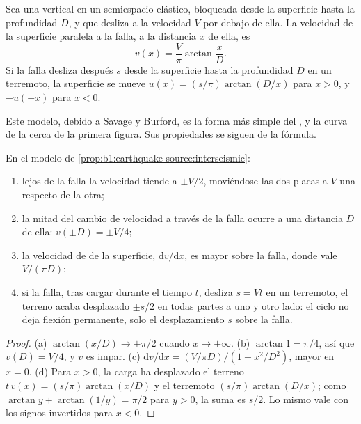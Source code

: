 \begin{proposition}\label{prop:b1:earthquake-source:interseismic}
Sea una  vertical en un semiespacio elástico, bloqueada desde la superficie hasta la profundidad $D$, y que desliza a la
velocidad $V$ por debajo de ella. La velocidad de la superficie paralela a la falla, a la distancia $x$ de ella, es
\[
  v(x) = \frac{V}{\pi}\arctan\frac{x}{D} .
\]
Si la falla desliza después $s$ desde la superficie hasta la profundidad $D$ en un terremoto, la superficie se mueve $u(x) = (s/\pi)\arctan(D/x)$
para $x > 0$, y $-u(-x)$ para $x < 0$.
\end{proposition}
\admitted

Este modelo, debido a Savage y Burford, es la forma más simple del , y la curva de la cerca de la primera figura. Sus
propiedades se siguen de la fórmula.

\begin{proposition}\label{prop:b1:earthquake-source:profile}
En el modelo de \cref{prop:b1:earthquake-source:interseismic}:
\begin{enumerate}[label=(\alph*)]
  \item lejos de la falla la velocidad tiende a $\pm V/2$, moviéndose las dos placas a $V$ una respecto de la otra;
  \item la mitad del cambio de velocidad a través de la falla ocurre a una distancia $D$ de ella: $v(\pm D) = \pm V/4$;
  \item la velocidad de  de la superficie, $\mathrm dv/\mathrm dx$, es mayor sobre la falla, donde vale $V/(\pi D)$;
  \item si la falla, tras cargar durante el tiempo $t$, desliza $s = Vt$ en un terremoto, el terreno acaba desplazado $\pm s/2$ en todas
        partes a uno y otro lado: el ciclo no deja flexión permanente, solo el desplazamiento $s$ sobre la falla.
\end{enumerate}
\end{proposition}

\begin{proof}
(a) $\arctan(x/D) \to \pm\pi/2$ cuando $x \to \pm\infty$. (b) $\arctan 1 = \pi/4$,
así que $v(D) = V/4$, y $v$ es impar. (c) $\mathrm dv/\mathrm dx = (V/\pi D)/(1 +
x^2/D^2)$, mayor en $x = 0$. (d) Para $x > 0$, la carga ha desplazado el
terreno $t\,v(x) = (s/\pi)\arctan(x/D)$ y el terremoto $(s/\pi)\arctan(D/x)$;
como $\arctan y + \arctan(1/y) = \pi/2$ para $y > 0$, la suma es $s/2$. Lo mismo
vale con los signos invertidos para $x < 0$.
\end{proof}

